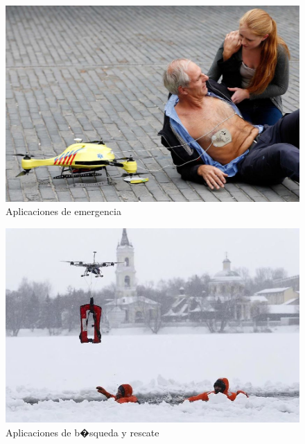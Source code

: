 \begin{figure}[h!]
	\centering
	\includegraphics[width=0.7\linewidth, height=0.2\textheight]{Imagenes/dron_apli_rescue}
	\caption{Aplicaciones de emergencia}
	\label{fig:dronaplirescue}
\end{figure}

\begin{figure}[h!]
	\centering
	\includegraphics[width=0.7\linewidth, height=0.2\textheight]{Imagenes/dron_apli_rescue2}
	\caption{Aplicaciones de b�squeda y rescate}
	\label{fig:dronaplirescue2}
\end{figure}



